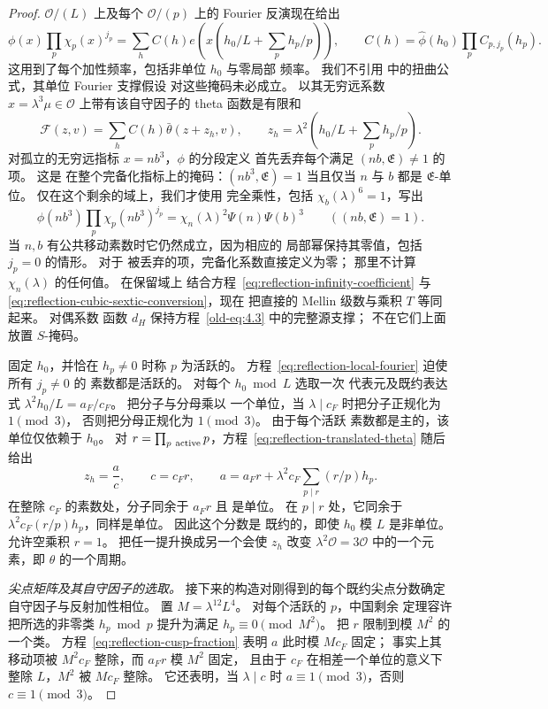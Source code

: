 \documentclass[11pt,a4paper]{article}
\numberwithin{equation}{section}
\numberwithin{figure}{section}
\theoremstyle{definition}
\theoremstyle{remark}
\begin{document}
\begin{proof}
$\mathcal O/(L)$ 上及每个 $\mathcal O/(p)$ 上的
Fourier 反演现在给出
\[
 \phi(x)\prod_p\chi_p(x)^{j_p}
  =\sum_h C(h)e\!\left(x\left(h_0/L+\sum_p h_p/p\right)\right),
 \qquad C(h)=\widehat\phi(h_0)\prod_pC_{p,j_p}(h_p).
\]
这用到了每个加性频率，包括非单位 $h_0$ 与零局部
频率。 我们不引用
\cite[引理~5.2 与推论~5.1]{DR} 中的扭曲公式，其单位 Fourier 支撑假设
对这些掩码未必成立。 以其无穷远系数 $x=\lambda^3\mu\in\mathcal O$
上带有该自守因子的 theta 函数是有限和
\begin{equation}\label{eq:reflection-translated-theta}
 \mathcal F(z,v)=\sum_hC(h)\bar\theta(z+z_h,v),\qquad
 z_h=\lambda^2\left(h_0/L+\sum_p h_p/p\right).
\end{equation}
对孤立的无穷远指标 $x=nb^3$，$\phi$ 的分段定义
首先丢弃每个满足 $(nb,\mathfrak E)\ne1$ 的项。 这是
在整个完备化指标上的掩码：$(nb^3,\mathfrak E)=1$ 当且仅当 $n$
与 $b$ 都是 $\mathfrak E$-单位。 仅在这个剩余的域上，我们才使用
完全乘性，包括 $\chi_b(\lambda)^6=1$，写出
\[
 \phi(nb^3)\prod_p\chi_p(nb^3)^{j_p}
 =\chi_n(\lambda)^2\Psi(n)\Psi(b)^3
 \qquad((nb,\mathfrak E)=1).
\]
当 $n,b$ 有公共移动素数时它仍然成立，因为相应的
局部幂保持其零值，包括 $j_p=0$ 的情形。 对于
被丢弃的项，完备化系数直接定义为零；
那里不计算 $\chi_n(\lambda)$ 的任何值。 在保留域上
结合方程~\eqref{eq:reflection-infinity-coefficient} 与
\eqref{eq:reflection-cubic-sextic-conversion}，现在
把直接的 Mellin 级数与乘积 $T$ 等同起来。 对偶系数
函数 $d_H$ 保持方程~\eqref{old-eq:4.3} 中的完整源支撑；
不在它们上面放置 $S$-掩码。

固定 $h_0$，并恰在 $h_p\ne0$ 时称 $p$ 为活跃的。
方程~\eqref{eq:reflection-local-fourier} 迫使所有 $j_p\ne0$ 的
素数都是活跃的。 对每个 $h_0\bmod L$ 选取一次
代表元及既约表达式
$\lambda^2h_0/L=a_F/c_F$。 把分子与分母乘以
一个单位，当 $\lambda\mid c_F$ 时把分子正规化为 $1\pmod3$，
否则把分母正规化为 $1\pmod3$。 由于每个活跃
素数都是主的，该单位仅依赖于 $h_0$。
对 $r=\prod_{p\ {\rm active}}p$，方程~\eqref{eq:reflection-translated-theta}
随后给出
\begin{equation}\label{eq:reflection-cusp-fraction}
 z_h=\frac ac,\qquad c=c_Fr,\qquad
 a=a_Fr+\lambda^2c_F\sum_{p\mid r}(r/p)h_p.
\end{equation}
在整除 $c_F$ 的素数处，分子同余于 $a_Fr$ 且
是单位。 在 $p\mid r$ 处，它同余于
$\lambda^2c_F(r/p)h_p$，同样是单位。 因此这个分数是
既约的，即使 $h_0$ 模 $L$ 是非单位。 允许空乘积
$r=1$。 把任一提升换成另一个会使 $z_h$ 改变
$\lambda^2\mathcal O=3\mathcal O$ 中的一个元素，即 $\theta$ 的一个周期。

\emph{尖点矩阵及其自守因子的选取。}
接下来的构造对刚得到的每个既约尖点分数确定
自守因子与反射加性相位。
置 $M=\lambda^{12}L^4$。 对每个活跃的 $p$，中国剩余
定理容许把所选的非零类 $h_p\bmod p$ 提升为满足
$h_p\equiv0\pmod{M^2}$。 把 $r$ 限制到模 $M^2$ 的一个类。
方程~\eqref{eq:reflection-cusp-fraction} 表明 $a$ 此时模 $Mc_F$ 固定；
事实上其移动项被 $M^2c_F$ 整除，而 $a_Fr$ 模 $M^2$ 固定，
且由于 $c_F$ 在相差一个单位的意义下整除 $L$，$M^2$ 被 $Mc_F$ 整除。
它还表明，当 $\lambda\mid c$ 时 $a\equiv1\pmod3$，否则
$c\equiv1\pmod3$。


\end{proof}
\end{document}
